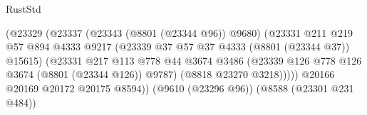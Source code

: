 \begin{lexlean}{RustStd}
\begin{coremodule}
                                                    (@23329
                                                      (@23337
                                                        (@23343 (@8801 (@23344 @96)) @9680)
                                                        (@23331
                                                          @211
                                                          @219
                                                          @57
                                                          @894
                                                          @4333
                                                          @9217
                                                          (@23339
                                                            @37
                                                            @57
                                                            @37
                                                            @4333
                                                            (@8801 (@23344 @37))
                                                            @15615)
                                                          (@23331
                                                            @217
                                                            @113
                                                            @778
                                                            @44
                                                            @3674
                                                            @3486
                                                            (@23339
                                                              @126
                                                              @778
                                                              @126
                                                              @3674
                                                              (@8801 (@23344 @126))
                                                              @9787)
                                                            (@8818 @23270 @3218)))))
                                                    @20166
                                                    @20169
                                                    @20172
                                                    @20175
                                                    @8594))
                                                (@9610 (@23296 @96))
                                                (@8588 (@23301 @231 @484))

\end{coremodule}
\end{lexlean}
